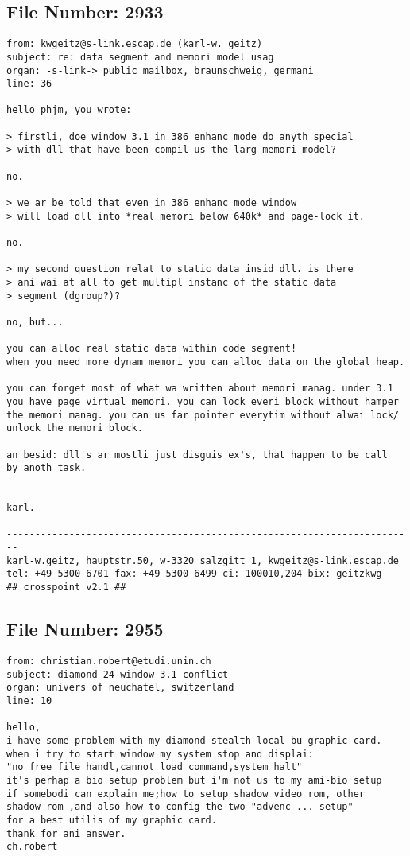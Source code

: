 \subsection{File Number: 2933}
\begin{verbatim}
from: kwgeitz@s-link.escap.de (karl-w. geitz)
subject: re: data segment and memori model usag
organ: -s-link-> public mailbox, braunschweig, germani
line: 36

hello phjm, you wrote:

> firstli, doe window 3.1 in 386 enhanc mode do anyth special
> with dll that have been compil us the larg memori model?

no.

> we ar be told that even in 386 enhanc mode window
> will load dll into *real memori below 640k* and page-lock it.

no.

> my second question relat to static data insid dll. is there
> ani wai at all to get multipl instanc of the static data
> segment (dgroup?)?

no, but...

you can alloc real static data within code segment!
when you need more dynam memori you can alloc data on the global heap.

you can forget most of what wa written about memori manag. under 3.1
you have page virtual memori. you can lock everi block without hamper
the memori manag. you can us far pointer everytim without alwai lock/
unlock the memori block.

an besid: dll's ar mostli just disguis ex's, that happen to be call
by anoth task.


karl.

------------------------------------------------------------------------
karl-w.geitz, hauptstr.50, w-3320 salzgitt 1, kwgeitz@s-link.escap.de
tel: +49-5300-6701 fax: +49-5300-6499 ci: 100010,204 bix: geitzkwg
## crosspoint v2.1 ##
\end{verbatim}
\subsection{File Number: 2955}
\begin{verbatim}
from: christian.robert@etudi.unin.ch
subject: diamond 24-window 3.1 conflict
organ: univers of neuchatel, switzerland
line: 10

hello,
i have some problem with my diamond stealth local bu graphic card.
when i try to start window my system stop and displai:
"no free file handl,cannot load command,system halt"
it's perhap a bio setup problem but i'm not us to my ami-bio setup
if somebodi can explain me;how to setup shadow video rom, other 
shadow rom ,and also how to config the two "advenc ... setup"
for a best utilis of my graphic card.
thank for ani answer.
ch.robert
\end{verbatim}
